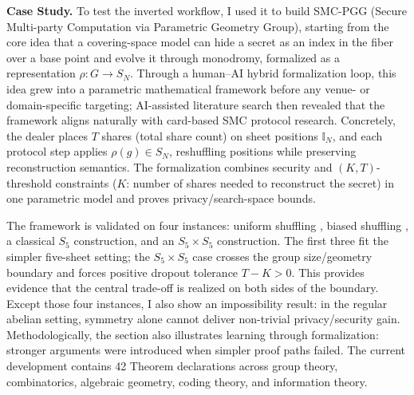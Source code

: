 \documentclass[11pt,a4paper]{article}
\begin{document}
\noindent\textbf{Case Study.}
To test the inverted workflow, I used it to build SMC-PGG (Secure Multi-party
Computation via Parametric Geometry Group), starting from the core idea that a
covering-space model can hide a secret as an index in the fiber over a base
point and evolve it through monodromy, formalized as a representation \(\rho : G \to S_N\).
Through a human--AI hybrid formalization loop, this idea grew into a parametric
mathematical framework before any venue- or domain-specific targeting;
AI-assisted literature search then revealed that the framework aligns naturally
with card-based SMC protocol research.
%
%
Concretely, the dealer places \(T\) shares (total share count) on sheet
positions \(\mathbb{I}_N\), and each protocol step applies \(\rho(g)\in S_N\),
reshuffling positions while preserving reconstruction semantics. The
formalization combines security and \((K,T)\)-threshold constraints (\(K\):
number of shares needed to reconstruct the secret) in one parametric model and
proves privacy/search-space bounds.

%

%
The framework is validated on four instances: uniform shuffling
\cite{denBoer1989}, biased shuffling \cite{KimCetinkaya2025}, a classical
\(S_5\) construction, and an \(S_5 \times S_5\) construction. The first three fit the
simpler five-sheet setting; the \(S_5 \times S_5\) case crosses the group size/geometry
boundary and forces positive dropout tolerance \(T-K>0\). This provides evidence
that the central trade-off is realized on both sides of the boundary.
Except those four instances, I also show an impossibility
result: in the regular abelian setting, symmetry alone cannot deliver
non-trivial privacy/security gain.
%
Methodologically, the section also illustrates learning through formalization:
stronger arguments were introduced when simpler proof paths failed. The current
development contains 42 Theorem declarations across group theory, combinatorics,
algebraic geometry, coding theory, and information theory.
\end{document}
